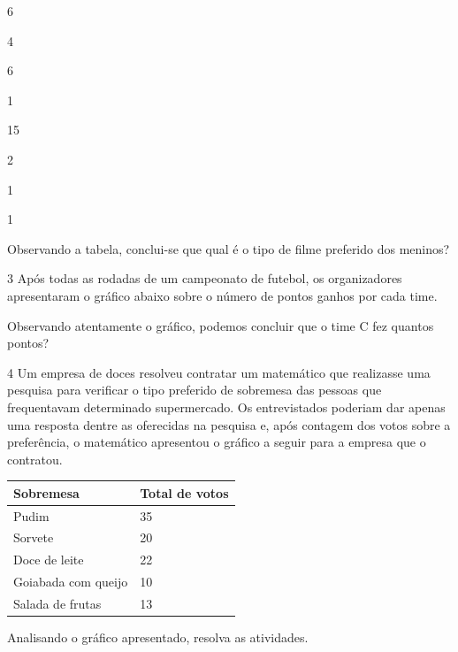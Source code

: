\begin{multicols}{2}
6

4

6

1

\columnbreak

 15

 2

 1

 1
\end{multicols} 

Observando a tabela, conclui-se que qual é o tipo de filme preferido dos meninos?



\num{3} Após todas as rodadas de um campeonato de futebol, os organizadores
apresentaram o gráfico abaixo sobre o número de pontos ganhos por cada time.


Observando atentamente o gráfico, podemos concluir que o time C fez quantos pontos?



\num{4} Um empresa de doces resolveu contratar um matemático que realizasse
uma pesquisa para verificar o tipo preferido de sobremesa das pessoas
que frequentavam determinado supermercado. Os entrevistados poderiam dar
apenas uma resposta dentre as oferecidas na pesquisa e, após contagem dos
votos sobre a preferência, o matemático apresentou o gráfico a seguir
para a empresa que o contratou.


\begin{longtable}[]{@{}ll@{}}
\toprule
Sobremesa & Total de votos\tabularnewline
\midrule
\endhead
Pudim & 35\tabularnewline
Sorvete & 20\tabularnewline
Doce de leite & 22\tabularnewline
Goiabada com queijo & 10\tabularnewline
Salada de frutas & 13\tabularnewline
\bottomrule
\end{longtable}

Analisando o gráfico apresentado, resolva as atividades.

